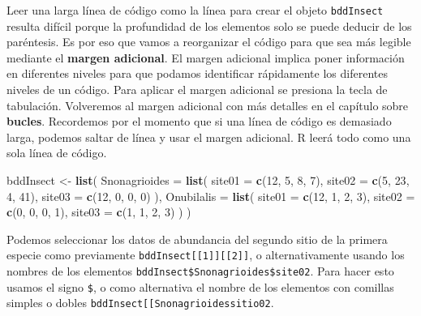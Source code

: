 \documentclass[]{book}
\makeatletter
\newenvironment{Shaded}{\begin{snugshade}}{\end{snugshade}}
\newcommand{\KeywordTok}[1]{\textcolor[rgb]{0.13,0.29,0.53}{\textbf{#1}}}
\newcommand{\DataTypeTok}[1]{\textcolor[rgb]{0.13,0.29,0.53}{#1}}
\newcommand{\DecValTok}[1]{\textcolor[rgb]{0.00,0.00,0.81}{#1}}
\newcommand{\StringTok}[1]{\textcolor[rgb]{0.31,0.60,0.02}{#1}}
\newcommand{\NormalTok}[1]{#1}
\newenvironment{kframe}{%
\medskip{}
\setlength{\fboxsep}{.8em}
 \def\at@end@of@kframe{}%
 \ifinner\ifhmode%
  \def\at@end@of@kframe{\end{minipage}}%
  \begin{minipage}{\columnwidth}%
 \fi\fi%
 \def\FrameCommand##1{\hskip\@totalleftmargin \hskip-\fboxsep
 \colorbox{shadecolor}{##1}\hskip-\fboxsep
     \hskip-\linewidth \hskip-\@totalleftmargin \hskip\columnwidth}%
 \MakeFramed {\advance\hsize-\width
   \@totalleftmargin\z@ \linewidth\hsize
   \@setminipage}}%
 {\par\unskip\endMakeFramed%
 \at@end@of@kframe}
\newenvironment{rmdblock}[1]
  {
  \begin{itemize}
  \renewcommand{\labelitemi}{
    \raisebox{-.7\height}[0pt][0pt]{
      {\setkeys{Gin}{width=3em,keepaspectratio}\texttt{[image: myIcons/\#1]}} %
    }
  }
  \setlength{\fboxsep}{1em}
  \begin{kframe}
  \item
  }
  {
  \end{kframe}
  \end{itemize}
  }
\newenvironment{rmdstyle}     %
  {\begin{rmdblock}{style}}   %
  {\end{rmdblock}}            %
\makeatother
\begin{document}
\begin{rmdstyle}
Leer una larga línea de código como la línea para crear el objeto
\texttt{bddInsect} resulta difícil porque la profundidad de los
elementos solo se puede deducir de los paréntesis. Es por eso que vamos
a reorganizar el código para que sea más legible mediante el
\textbf{margen adicional}. El margen adicional implica poner información
en diferentes niveles para que podamos identificar rápidamente los
diferentes niveles de un código. Para aplicar el margen adicional se
presiona la tecla de tabulación. Volveremos al margen adicional con más
detalles en el capítulo sobre \textbf{bucles}. Recordemos por el momento
que si una línea de código es demasiado larga, podemos saltar de línea y
usar el margen adicional. R leerá todo como una sola línea de código.
\end{rmdstyle}

\begin{Shaded}
\begin{Highlighting}[]
\NormalTok{bddInsect <-}\StringTok{ }\KeywordTok{list}\NormalTok{(}
  \DataTypeTok{Snonagrioides =} \KeywordTok{list}\NormalTok{(}
    \DataTypeTok{site01 =} \KeywordTok{c}\NormalTok{(}\DecValTok{12}\NormalTok{, }\DecValTok{5}\NormalTok{, }\DecValTok{8}\NormalTok{, }\DecValTok{7}\NormalTok{), }
    \DataTypeTok{site02 =} \KeywordTok{c}\NormalTok{(}\DecValTok{5}\NormalTok{, }\DecValTok{23}\NormalTok{, }\DecValTok{4}\NormalTok{, }\DecValTok{41}\NormalTok{), }
    \DataTypeTok{site03 =} \KeywordTok{c}\NormalTok{(}\DecValTok{12}\NormalTok{, }\DecValTok{0}\NormalTok{, }\DecValTok{0}\NormalTok{, }\DecValTok{0}\NormalTok{)}
\NormalTok{  ), }
  \DataTypeTok{Onubilalis =} \KeywordTok{list}\NormalTok{(}
    \DataTypeTok{site01 =} \KeywordTok{c}\NormalTok{(}\DecValTok{12}\NormalTok{, }\DecValTok{1}\NormalTok{, }\DecValTok{2}\NormalTok{, }\DecValTok{3}\NormalTok{), }
    \DataTypeTok{site02 =} \KeywordTok{c}\NormalTok{(}\DecValTok{0}\NormalTok{, }\DecValTok{0}\NormalTok{, }\DecValTok{0}\NormalTok{, }\DecValTok{1}\NormalTok{), }
    \DataTypeTok{site03 =} \KeywordTok{c}\NormalTok{(}\DecValTok{1}\NormalTok{, }\DecValTok{1}\NormalTok{, }\DecValTok{2}\NormalTok{, }\DecValTok{3}\NormalTok{)}
\NormalTok{  )}
\NormalTok{)}
\end{Highlighting}
\end{Shaded}

Podemos seleccionar los datos de abundancia del segundo sitio de la
primera especie como previamente
\texttt{bddInsect{[}{[}1{]}{]}{[}{[}2{]}{]}}, o alternativamente usando
los nombres de los elementos \texttt{bddInsect\$Snonagrioides\$site02}.
Para hacer esto usamos el signo \texttt{\$}, o como alternativa el
nombre de los elementos con comillas simples o dobles
\texttt{bddInsect{[}{[}\textquotesingle{}Snonagrioides\textquotesingle{}{]}{]}{[}{[}\textquotesingle{}sitio02\textquotesingle{}{]}{]}}.
\end{document}
